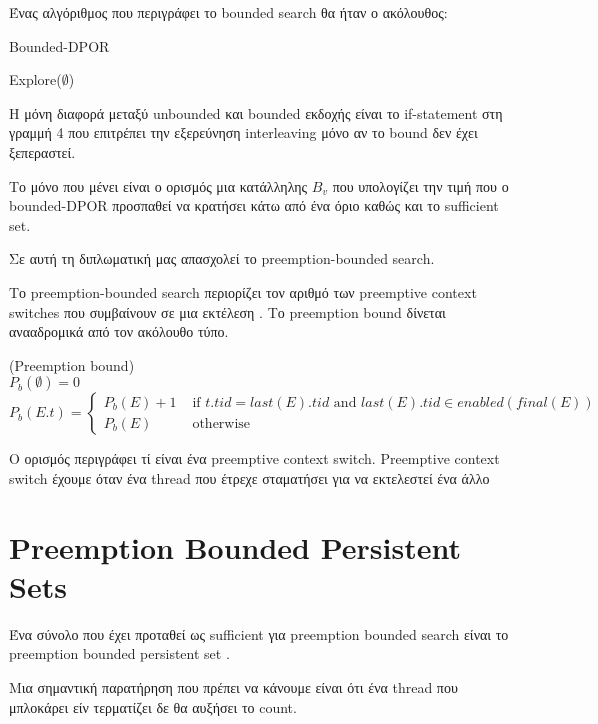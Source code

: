 Ένας αλγόριθμος που περιγράφει το bounded search θα ήταν ο ακόλουθος:

\begin{algorithm}[H]
    \caption{Bounded-DPOR}
    Explore($\emptyset$)\;
\end{algorithm}

\noindent Η μόνη διαφορά μεταξύ unbounded και bounded εκδοχής είναι το if-statement στη γραμμή 4 που επιτρέπει την εξερεύνηση interleaving μόνο αν το bound δεν έχει 
ξεπεραστεί.

Το μόνο που μένει είναι ο ορισμός μια κατάλληλης $B_v$ που υπολογίζει την τιμή που ο bounded-DPOR προσπαθεί να κρατήσει κάτω από ένα όριο καθώς και το 
sufficient set.

Σε αυτή τη διπλωματική μας απασχολεί το preemption-bounded search.

Το preemption-bounded search περιορίζει τον αριθμό των preemptive context switches που συμβαίνουν σε μια εκτέλεση \cite{Musu07}. Το
preemption bound δίνεται ανααδρομικά από τον ακόλουθο τύπο. 

\begin{definition}{(Preemption bound)}
\\
$P_b(\emptyset) = 0$ \\
$P_b(E.t) = 
 \begin{cases} 
    P_b(E) + 1 & \text{ if } t.tid = last(E).tid \text{ and } last(E).tid \in enabled(final(E)) \\
    P_b(E) & \text{ otherwise }
 \end{cases}
$\\
\end{definition}

Ο ορισμός περιγράφει τί είναι ένα preemptive context switch. Preemptive context switch έχουμε όταν ένα thread που έτρεχε σταματήσει για να εκτελεστεί ένα άλλο

\section{Preemption Bounded Persistent Sets}

Ένα σύνολο που έχει προταθεί ως sufficient για preemption bounded search είναι το preemption bounded persistent set \cite{BPOR}.

Μια σημαντική παρατήρηση που πρέπει να κάνουμε είναι ότι ένα thread που μπλοκάρει είν τερματίζει δε θα αυξήσει το  count.

